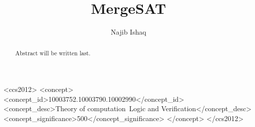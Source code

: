 \documentclass[acmsmall]{acmart}
\begin{document}
    \title{MergeSAT}

    \author{Najib Ishaq}

    \renewcommand{\shortauthors}{Najib}

    \begin{abstract}
        Abstract will be written last.
    \end{abstract}

    \begin{CCSXML}
        <ccs2012>
            <concept>
                <concept_id>10003752.10003790.10002990</concept_id>
                <concept_desc>Theory of computation~Logic and Verification</concept_desc>
                <concept_significance>500</concept_significance>
            </concept>
        </ccs2012>
\end{CCSXML}

    \maketitle



    
    
    
    
    
    

    
    
\end{document}

